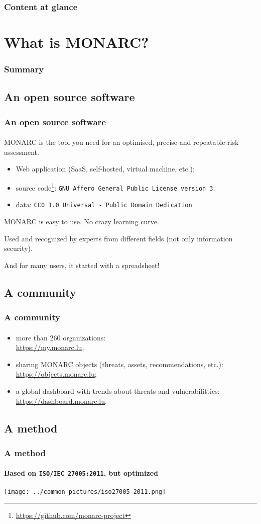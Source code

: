 \setcounter{tocdepth}{1}
\begin{frame}
  \frametitle{Content at glance}
  \tableofcontents
\end{frame}
\setcounter{tocdepth}{4}

%
%
\section{What is MONARC?}
\begin{frame}
  \frametitle{Summary}
\end{frame}
\subsection{An open source software}
\begin{frame}
  \frametitle{An open source software}
  \framesubtitle{}
  MONARC is the tool you need for an optimised, precise and repeatable risk assessment.

  \bigskip
  \begin{itemize}
    \item Web application (SaaS, self-hosted, virtual machine, etc.);
    \item source code\footnote{\url{https://github.com/monarc-project}}:
    \texttt{GNU Affero General Public License version 3};
    \item data: \texttt{CC0 1.0 Universal - Public Domain Dedication}.
  \end{itemize}

  \bigskip
  MONARC is easy to use. No crazy learning curve.

  Used and recognized by experts from different fields (not only information security).

  \bigskip
  And for many users, it started with a spreadsheet!
\end{frame}

\subsection{A community}
\begin{frame}
  \frametitle{A community}
  \framesubtitle{}
  \begin{itemize}
    \item more than 260 organizations:\\ \url{https://my.monarc.lu};
    \item sharing MONARC objects (threats, assets, recommendations, etc.):\\
    \url{https://objects.monarc.lu};
    \item a global dashboard with trends about threats and vulnerabilitties:\\
    \url{https://dashboard.monarc.lu}.
  \end{itemize}
\end{frame}

\subsection{A method}
\begin{frame}
  \frametitle{A method}
  \framesubtitle{Based on \texttt{ISO/IEC 27005:2011}, but optimized}
  \begin{center}
    \texttt{[image: ../common\_pictures/iso27005-2011.png]}
  \end{center}
\end{frame}
